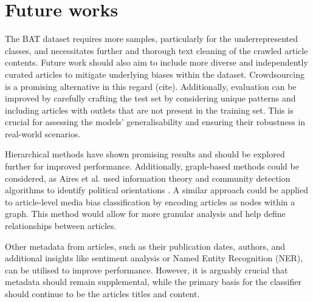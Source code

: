 


\section{Future works}

The BAT dataset requires more samples, particularly for the underrepresented classes, and necessitates further and thorough text cleaning of the crawled article contents. Future work should also aim to include more diverse and independently curated articles to mitigate underlying biases within the dataset. Crowdsourcing is a promising alternative in this regard (cite). Additionally, evaluation can be improved by carefully crafting the test set by considering unique patterns and including articles with outlets that are not present in the training set. This is crucial for assessing the models' generalisability and ensuring their robustness in real-world scenarios.

Hierarchical methods have shown promising results and should be explored further for improved performance. Additionally, graph-based methods could be considered, as Aires et al. used information theory and community detection algorithms to identify political orientations \cite{aires-2020-information}. A similar approach could be applied to article-level media bias classification by encoding articles as nodes within a graph. This method would allow for more granular analysis and help define relationships between articles.

Other metadata from articles, such as their publication dates, authors, and additional insights like sentiment analysis or Named Entity Recognition (NER), can be utilised to improve performance. However, it is arguably crucial that metadata should remain supplemental, while the primary basis for the classifier should continue to be the articles titles and content.



